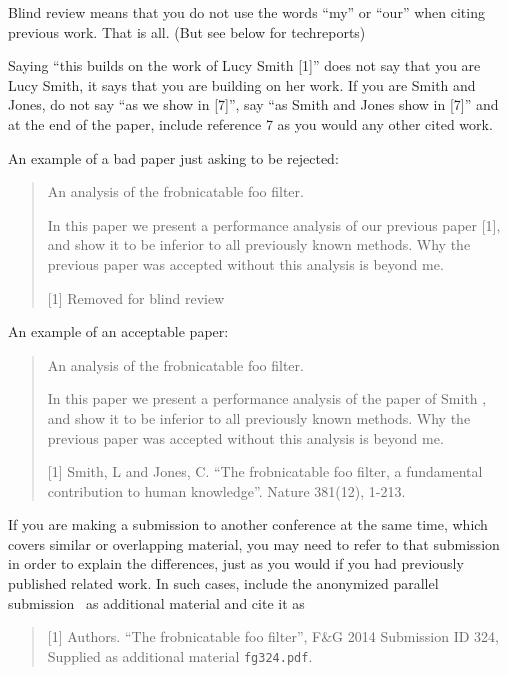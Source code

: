 \documentclass[10pt,twocolumn,letterpaper]{article}
\begin{document}
Blind review means that you do not use the words ``my'' or ``our''
when citing previous work.  That is all.  (But see below for
techreports)

Saying ``this builds on the work of Lucy Smith [1]'' does not say
that you are Lucy Smith, it says that you are building on her
work.  If you are Smith and Jones, do not say ``as we show in
[7]'', say ``as Smith and Jones show in [7]'' and at the end of the
paper, include reference 7 as you would any other cited work.

An example of a bad paper just asking to be rejected:
\begin{quote}
\begin{center}
    An analysis of the frobnicatable foo filter.
\end{center}

   In this paper we present a performance analysis of our
   previous paper [1], and show it to be inferior to all
   previously known methods.  Why the previous paper was
   accepted without this analysis is beyond me.

   [1] Removed for blind review
\end{quote}


An example of an acceptable paper:

\begin{quote}
\begin{center}
     An analysis of the frobnicatable foo filter.
\end{center}

   In this paper we present a performance analysis of the
   paper of Smith \etal [1], and show it to be inferior to
   all previously known methods.  Why the previous paper
   was accepted without this analysis is beyond me.

   [1] Smith, L and Jones, C. ``The frobnicatable foo
   filter, a fundamental contribution to human knowledge''.
   Nature 381(12), 1-213.
\end{quote}

If you are making a submission to another conference at the same time,
which covers similar or overlapping material, you may need to refer to that
submission in order to explain the differences, just as you would if you
had previously published related work.  In such cases, include the
anonymized parallel submission~\cite{Authors14} as additional material and
cite it as
\begin{quote}
[1] Authors. ``The frobnicatable foo filter'', F\&G 2014 Submission ID 324,
Supplied as additional material {\tt fg324.pdf}.
\end{quote}
\end{document}
